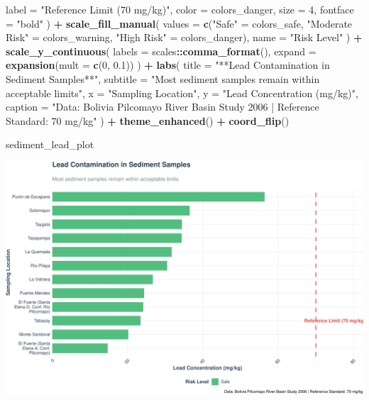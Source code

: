 \documentclass[
]{article}
\newenvironment{Shaded}{\begin{snugshade}}{\end{snugshade}}
\newcommand{\AttributeTok}[1]{\textcolor[rgb]{0.13,0.29,0.53}{#1}}
\newcommand{\DecValTok}[1]{\textcolor[rgb]{0.00,0.00,0.81}{#1}}
\newcommand{\FloatTok}[1]{\textcolor[rgb]{0.00,0.00,0.81}{#1}}
\newcommand{\FunctionTok}[1]{\textcolor[rgb]{0.13,0.29,0.53}{\textbf{#1}}}
\newcommand{\NormalTok}[1]{#1}
\newcommand{\OtherTok}[1]{\textcolor[rgb]{0.56,0.35,0.01}{#1}}
\newcommand{\SpecialCharTok}[1]{\textcolor[rgb]{0.81,0.36,0.00}{\textbf{#1}}}
\newcommand{\StringTok}[1]{\textcolor[rgb]{0.31,0.60,0.02}{#1}}
\begin{document}
\begin{Shaded}
\begin{Highlighting}[]
    \AttributeTok{label =} \StringTok{"Reference Limit (70 mg/kg)"}\NormalTok{,}
    \AttributeTok{color =}\NormalTok{ colors\_danger,}
    \AttributeTok{size =} \DecValTok{4}\NormalTok{,}
    \AttributeTok{fontface =} \StringTok{"bold"}
\NormalTok{  ) }\SpecialCharTok{+}
  \FunctionTok{scale\_fill\_manual}\NormalTok{(}
    \AttributeTok{values =} \FunctionTok{c}\NormalTok{(}\StringTok{"Safe"} \OtherTok{=}\NormalTok{ colors\_safe, }
               \StringTok{"Moderate Risk"} \OtherTok{=}\NormalTok{ colors\_warning, }
               \StringTok{"High Risk"} \OtherTok{=}\NormalTok{ colors\_danger),}
    \AttributeTok{name =} \StringTok{"Risk Level"}
\NormalTok{  ) }\SpecialCharTok{+}
  \FunctionTok{scale\_y\_continuous}\NormalTok{(}
    \AttributeTok{labels =}\NormalTok{ scales}\SpecialCharTok{::}\FunctionTok{comma\_format}\NormalTok{(),}
    \AttributeTok{expand =} \FunctionTok{expansion}\NormalTok{(}\AttributeTok{mult =} \FunctionTok{c}\NormalTok{(}\DecValTok{0}\NormalTok{, }\FloatTok{0.1}\NormalTok{))}
\NormalTok{  ) }\SpecialCharTok{+}
  \FunctionTok{labs}\NormalTok{(}
    \AttributeTok{title =} \StringTok{"**Lead Contamination in Sediment Samples**"}\NormalTok{,}
    \AttributeTok{subtitle =} \StringTok{"Most sediment samples remain within acceptable limits"}\NormalTok{,}
    \AttributeTok{x =} \StringTok{"Sampling Location"}\NormalTok{,}
    \AttributeTok{y =} \StringTok{"Lead Concentration (mg/kg)"}\NormalTok{,}
    \AttributeTok{caption =} \StringTok{"Data: Bolivia Pilcomayo River Basin Study 2006 | Reference Standard: 70 mg/kg"}
\NormalTok{  ) }\SpecialCharTok{+}
  \FunctionTok{theme\_enhanced}\NormalTok{() }\SpecialCharTok{+}
  \FunctionTok{coord\_flip}\NormalTok{()}

\NormalTok{sediment\_lead\_plot}
\end{Highlighting}
\end{Shaded}

\includegraphics{WHO_standards_pdf_02_files/figure-latex/sediment-lead-1.pdf}
\end{document}
